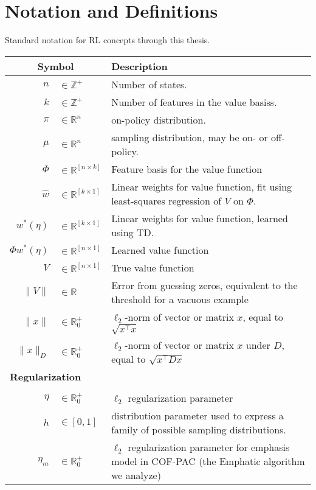 \chapter{Notation and Definitions}

Standard notation for RL concepts through this thesis.

\begin{longtable}{rl p{4in}}\hline\hline
	\multicolumn{2}{c}{Symbol} & Description
	\\\hline\endhead
	$n$                        & $\in\mathbb Z^+$ & Number of states.
	\\  $k$ & $\in\mathbb Z^+$ & Number of features in the value basiss.
	\\  $\pi$ & $\in\mathbb R^{n}$ & on-policy distribution.
	\\  $\mu$ & $\in\mathbb R^{n}$ & sampling distribution, may be on- or off-policy.
	\\  $\Phi$ & $\in \mathbb R^{[n\times k]}$ & Feature basis for the value function
	\\  $\hat w$ & $\in \mathbb R^{[k\times 1]}$ & Linear weights for value function, fit using least-squares regression of $V$ on $\Phi$.
	\\  $w^*(\eta)$ & $\in \mathbb R^{[k\times 1]}$ & Linear weights for value function, learned using TD.
	\\  $\Phi w^*(\eta)$ & $\in \mathbb R^{[n\times 1]}$ & Learned value function
	\\  $V$ & $\in \mathbb R^{[n\times 1]}$ & True value function
	\\  $\|V\|$ & $\in \mathbb R$ & Error from guessing zeros, equivalent to the threshold for a vacuous example
	\\  $\|x\|$ & $\in\mathbb R^+_0$ & $\ell_2$-norm of vector or matrix $x$, equal to $\sqrt{x^\top x}$
	\\  $\|x\|_D$ & $\in\mathbb R^+_0$ & $\ell_2$-norm of vector or matrix $x$ under $D$, equal to $\sqrt{x^\top D x}$
	\\ \hline\hline
	\multicolumn{3}{l}{\textbf{Regularization}}
	\\ \hline
	\\  $\eta$ & $\in \mathbb R^+_0$ & $\ell_2$ regularization parameter
	\\  $h$ & $\in[0, 1]$ & distribution parameter used to express a family of possible sampling distributions.
	\\  $\eta_m$ & $\in \mathbb R^+_0$ & $\ell_2$ regularization parameter for emphasis model in COF-PAC (the Emphatic algorithm we analyze)

\end{longtable}
